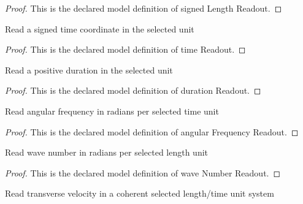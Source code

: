 \begin{proof}
  This is the declared model definition of signed Length Readout.
\end{proof}
\begin{definition}
  \label{def:physics:phyx-mini-0290:phyxminiproblems-problemphyxmini0290-timereadout}
  Read a signed time coordinate in the selected unit
\end{definition}
\begin{proof}
  This is the declared model definition of time Readout.
\end{proof}
\begin{definition}
  \label{def:physics:phyx-mini-0290:phyxminiproblems-problemphyxmini0290-durationreadout}
  Read a positive duration in the selected unit
\end{definition}
\begin{proof}
  This is the declared model definition of duration Readout.
\end{proof}
\begin{definition}
  \label{def:physics:phyx-mini-0290:phyxminiproblems-problemphyxmini0290-angularfrequencyreadout}
  Read angular frequency in radians per selected time unit
\end{definition}
\begin{proof}
  This is the declared model definition of angular Frequency Readout.
\end{proof}
\begin{definition}
  \label{def:physics:phyx-mini-0290:phyxminiproblems-problemphyxmini0290-wavenumberreadout}
  Read wave number in radians per selected length unit
\end{definition}
\begin{proof}
  This is the declared model definition of wave Number Readout.
\end{proof}
\begin{definition}
  \label{def:physics:phyx-mini-0290:phyxminiproblems-problemphyxmini0290-transversevelocityreadout}
  Read transverse velocity in a coherent selected length/time unit system
\end{definition}
